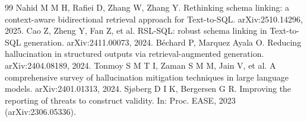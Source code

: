 \documentclass[11pt]{article}
\begin{document}
\begin{thebibliography}{99}
 Nahid M M H, Rafiei D, Zhang W, Zhang Y. Rethinking schema linking: a context-aware bidirectional retrieval approach for Text-to-SQL. arXiv:2510.14296, 2025.
 Cao Z, Zheng Y, Fan Z, et al. RSL-SQL: robust schema linking in Text-to-SQL generation. arXiv:2411.00073, 2024.
 B\'echard P, Marquez Ayala O. Reducing hallucination in structured outputs via retrieval-augmented generation. arXiv:2404.08189, 2024.
 Tonmoy S M T I, Zaman S M M, Jain V, et al. A comprehensive survey of hallucination mitigation techniques in large language models. arXiv:2401.01313, 2024.
 Sj\o berg D I K, Bergersen G R. Improving the reporting of threats to construct validity. In: Proc. EASE, 2023 (arXiv:2306.05336).
\end{thebibliography}
\end{document}
